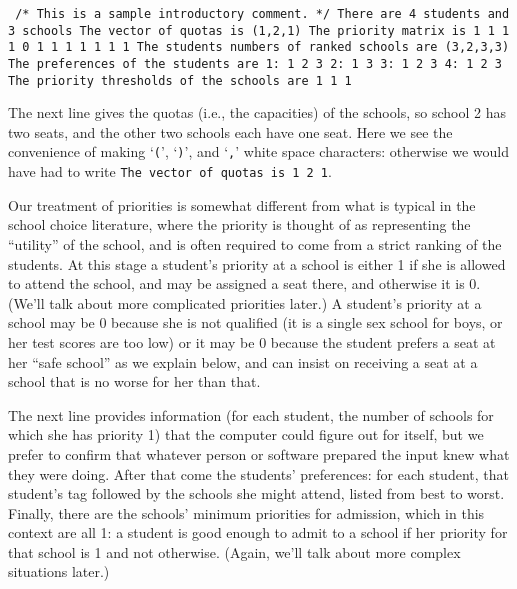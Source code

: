 \documentclass[12pt]{article}
\theoremstyle{definition}
\begin{document}
\begin{obeylines}\texttt{
/* This is a sample introductory comment. */
There are 4 students and 3 schools
The vector of quotas is (1,2,1)
The priority matrix is
     1     1     1
     1     0     1
     1     1     1
     1     1     1
The students numbers of ranked schools are (3,2,3,3)
The preferences of the students are
1:  1  2  3  
2:  1  3  
3:  1  2  3  
4:  1  2  3  
The priority thresholds of the schools are
1   1   1   
  }
\end{obeylines}

The next line gives the quotas (i.e., the capacities) of the schools,
so school 2 has two seats, and the other two schools each have one
seat.  Here we see the convenience of making `\texttt{(}',
`\texttt{)}', and `\texttt{,}' white space characters: otherwise we
would have had to write \texttt{The vector of quotas is 1 2 1}.

Our treatment of priorities is somewhat different from what is typical
in the school choice literature, where the priority is thought of as
representing the ``utility'' of the school, and is often required to
come from a strict ranking of the students.  At this stage a student's
priority at a school is either 1 if she is allowed to attend the
school, and may be assigned a seat there, and otherwise it is 0.
(We'll talk about more complicated priorities later.)  A student's
priority at a school may be 0 because she is not qualified (it is a
single sex school for boys, or her test scores are too low) or it may
be 0 because the student prefers a seat at her ``safe school'' as we
explain below, and can insist on receiving a seat at a school that is
no worse for her than that.

The next line provides information (for each student, the number of
schools for which she has priority 1) that the computer could figure
out for itself, but we prefer to confirm that whatever person or
software prepared the input knew what they were doing.  After that
come the students' preferences: for each student, that student's tag
followed by the schools she might attend, listed from best to worst.
Finally, there are the schools' minimum priorities for admission,
which in this context are all 1: a student is good enough to admit to
a school if her priority for that school is 1 and not
otherwise. (Again, we'll talk about more complex situations later.)
\end{document}
